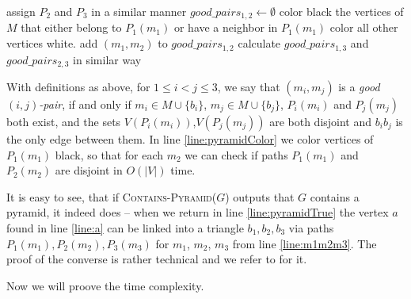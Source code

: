\begin{algorithmic}[1]
				\ls assign $P_2$ and $P_3$ in a similar manner
				\ls $good\_pairs_{1,2} \gets \emptyset$ 
				 
						\ls color black the vertices of $M$ that either belong to \label{line:pyramidColor}
						\lsx $P_1(m_1)$ or have a neighbor in $P_1(m_1)$
						\lsx color all other vertices white.
							 \label{line:pyramidColor2}
								\ls add $(m_1, m_2)$ to $good\_pairs_{1,2}$
							\mEndIf
						\mEndFor
					\mEndIf
				\mEndFor
				\ls calculate $good\_pairs_{1,3}$ and $good\_pairs_{2,3}$ in similar way
				 \label{line:m1m2m3}
						\ls \RETURN \TRUE \label{line:pyramidTrue}
					\mEndIf
				\mEndFor
			\mEndIf \label{line:pyramidEnd}
		\mEndFor
	\mEndFor
	\ls \RETURN \FALSE
	\mEndProcedure
\end{algorithmic}

With definitions as above, for $1 \leq i < j \leq 3$, we say that $(m_i, m_j)$ is a \emph{good $(i, j)$-pair}, if and only if $m_i \in M \cup \{b_i\}$, $m_j \in M \cup \{b_j\}$, $P_i(m_i)$ and $P_j(m_j)$ both exist, and the sets $V(P_i(m_i))$,$V(P_j(m_j))$ are both disjoint and $b_ib_j$ is the only edge between them. In line \ref{line:pyramidColor} we color vertices of $P_1(m_1)$ black, so that for each $m_2$ we can check if paths $P_1(m_1)$ and $P_2(m_2)$ are disjoint in $O(|V|)$ time.

It is easy to see, that if \textsc{Contains-Pyramid($G$)} outputs that $G$ contains a pyramid, it indeed does -- when we return in line \ref{line:pyramidTrue} the vertex $a$ found in line \ref{line:a} can be linked into a triangle $b_1, b_2, b_3$ via paths $P_1(m_1), P_2(m_2), P_3(m_3)$ for $m_1$, $m_2$, $m_3$ from line \ref{line:m1m2m3}. The proof of the converse is rather technical and we refer to  \cite{MC05} for it.

Now we will proove the time complexity.

